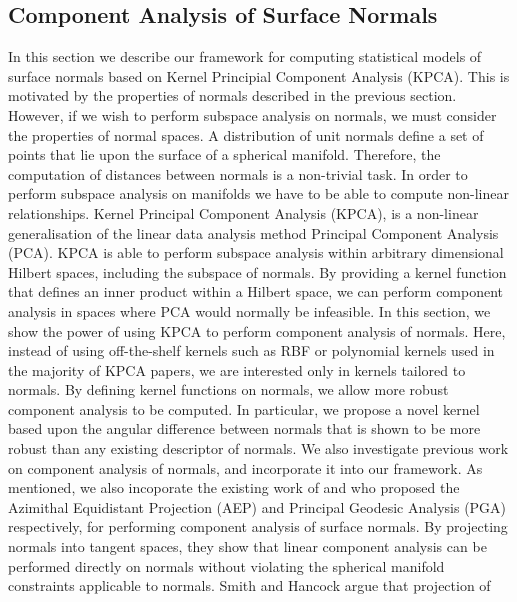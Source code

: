 \subsection{Component Analysis of Surface Normals}\label{subsec:singl_img_ca}
In this section we describe our framework for computing statistical models of
surface normals based on Kernel Principial Component Analysis (KPCA). This is
motivated by the properties of normals described in the previous section.
However, if we wish to perform subspace analysis on normals, we must consider
the properties of normal spaces. A distribution of unit normals define a set of
points that lie upon the surface of a spherical manifold. Therefore, the
computation of distances between normals is a non-trivial task. In order to
perform subspace analysis on manifolds we have to be able to compute non-linear
relationships. Kernel Principal Component Analysis (KPCA), is a non-linear
generalisation of the linear data analysis method Principal Component Analysis
(PCA). KPCA is able to perform subspace analysis within arbitrary dimensional
Hilbert spaces, including the subspace of normals. By providing a kernel
function that defines an inner product within a Hilbert space, we can perform
component analysis in spaces where PCA would normally be infeasible. In this
section, we show the power of using KPCA to perform component analysis of
normals. Here, instead of using off-the-shelf kernels such as RBF or polynomial
kernels used in the majority of KPCA papers, we are interested only in kernels
tailored to normals. By defining kernel functions on normals, we allow more
robust component analysis to be computed. In particular, we propose a novel
kernel based upon the angular difference between normals that is shown to be
more robust than any existing descriptor of normals. We also investigate
previous work on component analysis of normals, and incorporate it into our
framework. As mentioned, we also incoporate the existing work of
\citet{smith2006recovering} and \citet{smith2008facial} who proposed the
Azimithal Equidistant Projection (AEP) and Principal Geodesic Analysis (PGA)
respectively, for performing component analysis of surface normals. By
projecting normals into tangent spaces, they show that linear component analysis
can be performed directly on normals without violating the spherical manifold
constraints applicable to normals. Smith and Hancock argue that projection of
